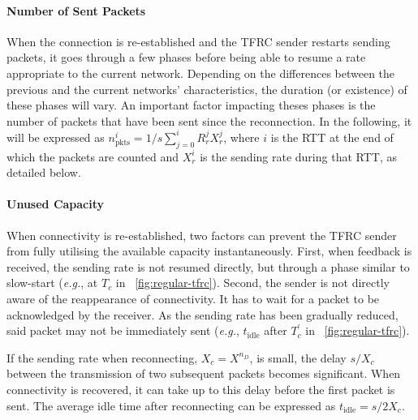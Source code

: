 \documentclass[twocolumn]{nictatechreport}
\newcommand{\latinlocution}[1]{\textit{#1}}
\newcommand{\eg}{\latinlocution{e.g.}}
\begin{document}
\paragraph{Number of Sent Packets}

When the connection is re-established and the TFRC sender restarts sending
packets, it goes through a few phases before being able to resume a rate
appropriate to the current network. Depending on the differences between the
previous and the current networks' characteristics, the duration (or existence)
of these phases will vary. An important factor impacting theses phases is the
number of packets that have been sent since the reconnection. In the following,
it will be expressed as
$n_\mathrm{pkts}^i = 1/s\sum_{j=0}^i R_r^jX_r^j$,
where $i$ is the RTT at the end of which the packets are counted and $X_r^i$
is the sending rate during that RTT, as detailed below.

\paragraph{Unused Capacity}

When connectivity is re-established, two factors can prevent the TFRC sender
from fully utilising the available capacity instantaneously.  First, when
feedback is received, the sending rate is not resumed directly, but through a
phase similar to slow-start (\eg, at $T_c$ in
\figurename~\ref{fig:regular-tfrc}).  Second, the sender is not directly aware
of the reappearance of connectivity. It has to wait for a packet to be
acknowledged by the receiver. As the sending rate has been gradually reduced,
said packet may not be immediately sent (\eg, $t_\mathrm{idle}$ after
$T^\prime_c$ in \figurename~\ref{fig:regular-tfrc}). 

If the sending rate when reconnecting, $X_c=X^{n_D}$, is small, the delay
$s/X_c$ between the transmission of two subsequent packets becomes significant.
When connectivity is recovered, it can take up to this delay before the first
packet is sent. The average idle time after reconnecting can be expressed as
$t_\mathrm{idle} = s/2X_c$.
\end{document}

